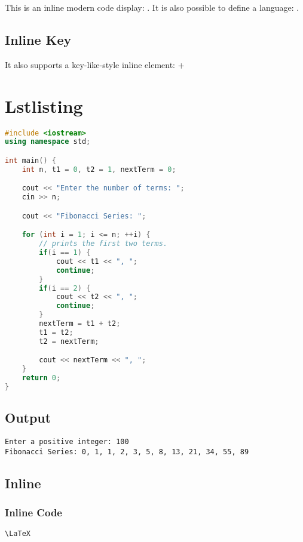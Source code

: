 \documentclass[10pt]{article}
\begin{document}
This is an inline modern code display: \moderncodeinline{\LaTeX}. It is also possible to define a language: .

\subsection{Inline Key}

It also supports a key-like-style inline element:  + 

\section{Lstlisting}

\begin{lstlisting}[caption=Example in C++,language=c++]
#include <iostream>
using namespace std;

int main() {
	int n, t1 = 0, t2 = 1, nextTerm = 0;

	cout << "Enter the number of terms: ";
	cin >> n;

	cout << "Fibonacci Series: ";

	for (int i = 1; i <= n; ++i) {
		// prints the first two terms.
		if(i == 1) {
			cout << t1 << ", ";
			continue;
		}
		if(i == 2) {
			cout << t2 << ", ";
			continue;
		}
		nextTerm = t1 + t2;
		t1 = t2;
		t2 = nextTerm;

		cout << nextTerm << ", ";
	}
	return 0;
}
\end{lstlisting}

\subsection{Output}

\begin{lstlisting}[style=lstoutput]
Enter a positive integer: 100
Fibonacci Series: 0, 1, 1, 2, 3, 5, 8, 13, 21, 34, 55, 89
\end{lstlisting}

\subsection{Inline}

\subsubsection{Inline Code}

\lstinline{\LaTeX}
\end{document}
